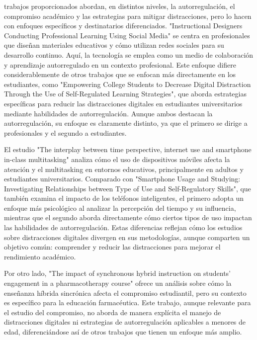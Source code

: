\documentclass[a4paper,fleqn]{cas-sc}
\begin{document}
	trabajos proporcionados abordan, en distintos niveles, la autorregulación, el compromiso académico y las estrategias para mitigar distracciones, pero lo hacen con enfoques específicos y destinatarios diferenciados. "Instructional Designers Conducting Professional Learning Using Social Media" se centra en profesionales que diseñan materiales educativos y cómo utilizan redes sociales para su desarrollo continuo. Aquí, la tecnología se emplea como un medio de colaboración y aprendizaje autorregulado en un contexto profesional. Este enfoque difiere considerablemente de otros trabajos que se enfocan más directamente en los estudiantes, como "Empowering College Students to Decrease Digital Distraction Through the Use of Self-Regulated Learning Strategies", que aborda estrategias específicas para reducir las distracciones digitales en estudiantes universitarios mediante habilidades de autorregulación. Aunque ambos destacan la autorregulación, su enfoque es claramente distinto, ya que el primero se dirige a profesionales y el segundo a estudiantes.
	
	El estudio "The interplay between time perspective, internet use and smartphone in-class multitasking" analiza cómo el uso de dispositivos móviles afecta la atención y el multitasking en entornos educativos, principalmente en adultos y estudiantes universitarios. Comparado con "Smartphone Usage and Studying: Investigating Relationships between Type of Use and Self-Regulatory Skills", que también examina el impacto de los teléfonos inteligentes, el primero adopta un enfoque más psicológico al analizar la percepción del tiempo y su influencia, mientras que el segundo aborda directamente cómo ciertos tipos de uso impactan las habilidades de autorregulación. Estas diferencias reflejan cómo los estudios sobre distracciones digitales divergen en sus metodologías, aunque comparten un objetivo común: comprender y reducir las distracciones para mejorar el rendimiento académico.
	
	Por otro lado, "The impact of synchronous hybrid instruction on students’ engagement in a pharmacotherapy course" ofrece un análisis sobre cómo la enseñanza híbrida sincrónica afecta el compromiso estudiantil, pero su contexto es específico para la educación farmacéutica. Este trabajo, aunque relevante para el estudio del compromiso, no aborda de manera explícita el manejo de distracciones digitales ni estrategias de autorregulación aplicables a menores de edad, diferenciándose así de otros trabajos que tienen un enfoque más amplio.
	
\end{document}
